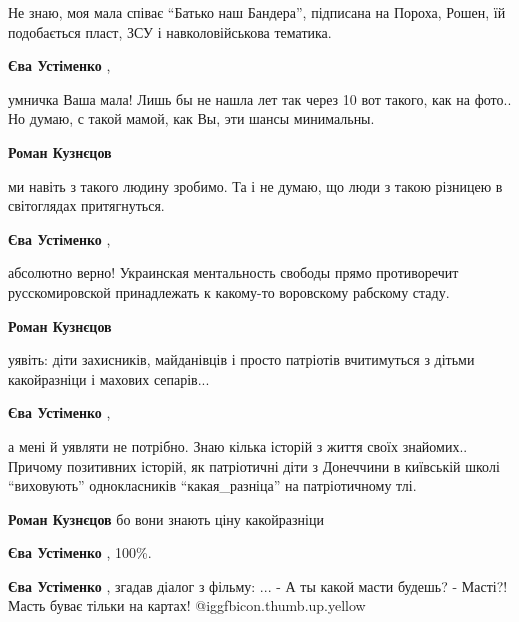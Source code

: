  
 
 
 
 
\zzSecCmt

\begin{itemize} %
Не знаю, моя мала співає \enquote{Батько наш Бандера}, підписана на Пороха,
Рошен, їй подобається пласт, ЗСУ і навколовійськова тематика.

\begin{itemize} %
\textbf{Єва Устіменко} , 

умничка Ваша мала! Лишь бы не нашла лет так через 10 вот такого, как на фото..
Но думаю, с такой мамой, как Вы, эти шансы минимальны.

\textbf{Роман Кузнєцов} 

ми навіть з такого людину зробимо. Та і не думаю, що люди з такою різницею в
світоглядах притягнуться.

\textbf{Єва Устіменко} , 

абсолютно верно! Украинская ментальность свободы прямо противоречит
русскомировской принадлежать к какому-то воровскому рабскому стаду.

\textbf{Роман Кузнєцов} 

уявіть: діти захисників, майданівців і просто патріотів вчитимуться з дітьми
какойразніци і махових сепарів...

\textbf{Єва Устіменко} , 

а мені й уявляти не потрібно. Знаю кілька історій з життя своїх знайомих..
Причому позитивних історій, як патріотичні діти з Донеччини в київській школі
\enquote{виховують} однокласників \enquote{какая\_разніца} на патріотичному
тлі.

\textbf{Роман Кузнєцов} бо вони знають ціну какойразніци

\textbf{Єва Устіменко} , 100\%.

\textbf{Єва Устіменко} , згадав діалог з фільму:
...
- А ты какой масти будешь?
- Масті?! Масть буває тільки на картах! @igg{fbicon.thumb.up.yellow} 


\end{itemize}
\end{itemize}

